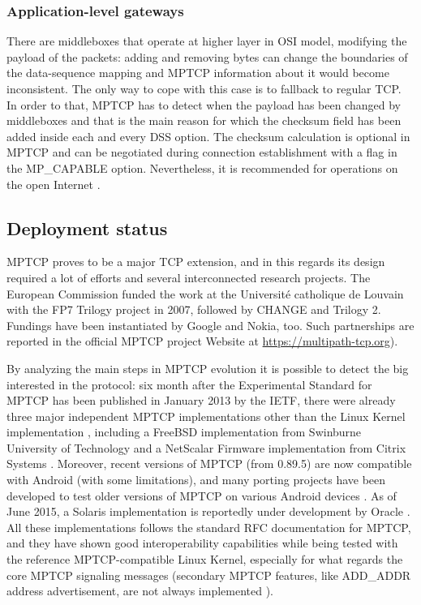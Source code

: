\subsubsection{Application-level gateways}
There are middleboxes that operate at higher layer in OSI model, modifying the payload of the packets: adding and removing bytes can change the boundaries of the data-sequence mapping and MPTCP information about it would become inconsistent. The only way to cope with this case is to fallback to regular TCP. In order to that, MPTCP has to detect when the payload has been changed by middleboxes and that is the main reason for which the checksum field has been added inside each and every DSS option. The checksum calculation is optional in MPTCP and can be negotiated during connection establishment with a flag in the MP\_CAPABLE option. Nevertheless, it is recommended for operations on the open Internet \cite{HDPDB13}.

\subsection{Deployment status}
MPTCP proves to be a major TCP extension, and in this regards its design required a lot of efforts and several interconnected research projects. The European Commission funded the work at the Université catholique de Louvain with the FP7 Trilogy project in 2007, followed by CHANGE and Trilogy 2. Fundings have been instantiated by Google and Nokia, too. Such partnerships are reported in the official MPTCP project Website at \url{https://multipath-tcp.org}).

By analyzing the main steps in MPTCP evolution it is possible to detect the big interested in the protocol: six month after the Experimental Standard for MPTCP has been published in January 2013 by the IETF, there were already three major independent MPTCP implementations other than the Linux Kernel implementation \cite{eardley-mptcp-implementations-survey-02}, including a FreeBSD implementation from Swinburne University of Technology \cite{caia} and a NetScalar Firmware implementation from Citrix Systems \cite{netscalar}.
Moreover, recent versions of MPTCP (from 0.89.5) are now compatible with Android (with some limitations), and many porting projects have been developed to test older versions of MPTCP on various Android devices \cite{mptcpandroid}.
As of June 2015, a Solaris implementation is reportedly under development by Oracle \cite{mptcpsolaris}.
All these implementations follows the standard RFC documentation for MPTCP, and they have shown good interoperability capabilities while being tested with the reference MPTCP-compatible Linux Kernel, especially for what regards the core MPTCP signaling messages (secondary MPTCP features, like ADD\_ADDR address advertisement, are not always implemented \cite{eardley-mptcp-implementations-survey-02}).

